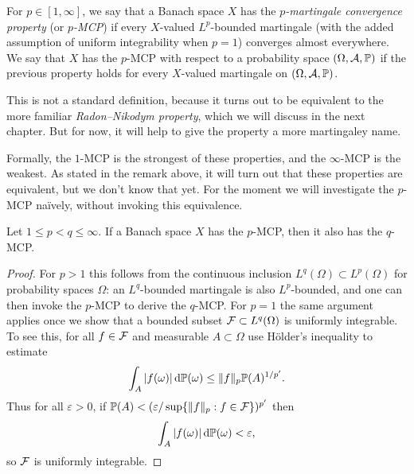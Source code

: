 \begin{defn}
  For $p \in [1,\infty]$, we say that a Banach space $X$ has the \emph{$p$-martingale convergence property} (or \emph{$p$-MCP}) if every $X$-valued $L^p$-bounded martingale (with the added assumption of uniform integrability when $p=1$) converges almost everywhere.
  We say that $X$ has the $p$-MCP with respect to a probability space $(\Omega,\mathcal{A},\mathbb{P})$ if the previous property holds for every $X$-valued martingale on $(\Omega,\mathcal{A},\mathbb{P})$.
\end{defn}

\begin{rmk}
  This is not a standard definition, because it turns out to be equivalent to the more familiar \emph{Radon--Nikodym property}, which we will discuss in the next chapter. But for now, it will help to give the property a more martingaley name.
\end{rmk}

Formally, the $1$-MCP is the strongest of these properties, and the $\infty$-MCP is the weakest.
As stated in the remark above, it will turn out that these properties are equivalent, but we don't know that yet.
For the moment we will investigate the $p$-MCP na\"ively, without invoking this equivalence.

\begin{prop}
  Let $1 \leq p < q \leq \infty$.
  If a Banach space $X$ has the $p$-MCP, then it also has the $q$-MCP.
\end{prop}

\begin{proof}
  For $p > 1$ this follows from the continuous inclusion $L^q(\Omega) \subset L^p(\Omega)$ for probability spaces $\Omega$: an $L^q$-bounded martingale is also $L^p$-bounded, and one can then invoke the $p$-MCP to derive the $q$-MCP.
  For $p = 1$ the same argument applies once we show that a bounded subset $\mathcal{F} \subset L^q(\Omega)$ is uniformly integrable.
  To see this, for all $f \in \mathcal{F}$ and measurable $A \subset \Omega$ use H\"older's inequality to estimate
  \begin{equation*}
    \int_{A} |f(\omega)| \, \mathrm{d}\mathbb{P}(\omega) \leq \|f\|_{p} \mathbb{P}(A)^{1/p'}.
  \end{equation*}
  Thus for all $\varepsilon > 0$, if $\mathbb{P}(A) < (\varepsilon/\sup\{\|f\|_p : f \in \mathcal{F}\})^{p'}$ then
  \begin{equation*}
    \int_{A} |f(\omega)| \, \mathrm{d}\mathbb{P}(\omega) < \varepsilon,
  \end{equation*}
  so $\mathcal{F}$ is uniformly integrable.
\end{proof}

